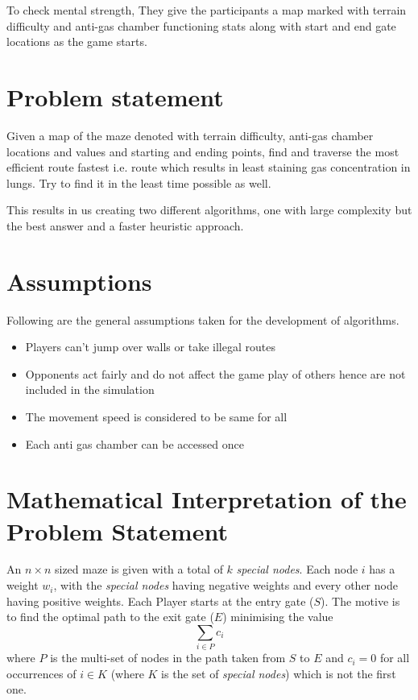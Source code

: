 \documentclass[12pt]{report}
\begin{document}
To check mental strength, They give the participants a map marked with terrain difficulty and anti-gas chamber functioning stats along with start and end gate locations as the game starts.

\section{Problem statement}
Given a map of the maze denoted with terrain difficulty, anti-gas chamber locations and values and starting and ending points, find and traverse the most efficient route fastest i.e. route which results in least staining gas concentration in lungs. Try to find it in the least time possible as well.

This results in us creating two different algorithms, one with large complexity but the best answer and a faster heuristic approach.

\section{Assumptions}
Following are the general assumptions taken for the development of algorithms.
\begin{itemize}
    \item Players can't jump over walls or take illegal routes
    \item Opponents act fairly and do not affect the game play of others hence are not included in the simulation
    \item The movement speed is considered to be same for all
    \item Each anti gas chamber can be accessed once
\end{itemize}

\section{Mathematical Interpretation of the Problem Statement}

An $n\times n$ sized maze is given with a total of $k$ \textit{special nodes}. Each node $i$ has a weight $w_i$, with the \textit{special nodes} having negative weights and every other node having positive weights. Each  Player starts at the entry gate ($S$). The motive is to find the optimal path to the exit gate ($E$) minimising the value
\begin{equation}
    \sum_{i \in P}{c_i}
\end{equation}
where $P$ is the multi-set of nodes in the path taken from $S$ to $E$ and $c_i=0$ for all occurrences of $i \in K$ (where $K$ is the set of \textit{special nodes}) which is not the first one.
\end{document}
